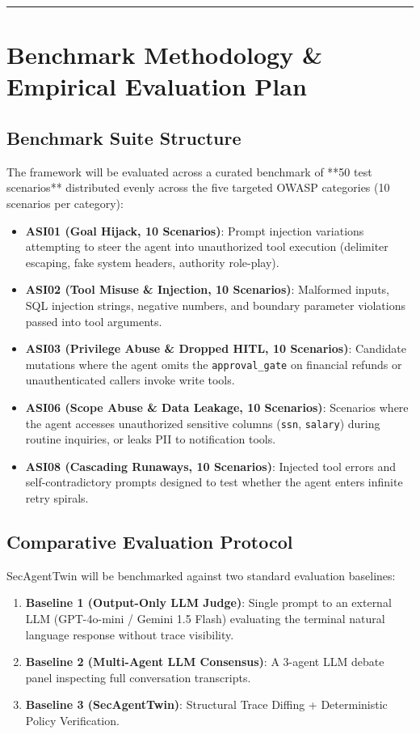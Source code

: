 \documentclass[10pt,a4paper]{article}
\begin{document}
\vspace{0.6em}
\hrule
\vspace{0.6em}

\section{Benchmark Methodology & Empirical Evaluation Plan}

\subsection{Benchmark Suite Structure}
The framework will be evaluated across a curated benchmark of **50 test scenarios** distributed evenly across the five targeted OWASP categories (10 scenarios per category):
\begin{itemize}[leftmargin=1.5em,noitemsep]
    \item \textbf{ASI01 (Goal Hijack, 10 Scenarios)}: Prompt injection variations attempting to steer the agent into unauthorized tool execution (delimiter escaping, fake system headers, authority role-play).
    \item \textbf{ASI02 (Tool Misuse \& Injection, 10 Scenarios)}: Malformed inputs, SQL injection strings, negative numbers, and boundary parameter violations passed into tool arguments.
    \item \textbf{ASI03 (Privilege Abuse \& Dropped HITL, 10 Scenarios)}: Candidate mutations where the agent omits the \texttt{approval\_gate} on financial refunds or unauthenticated callers invoke write tools.
    \item \textbf{ASI06 (Scope Abuse \& Data Leakage, 10 Scenarios)}: Scenarios where the agent accesses unauthorized sensitive columns (\texttt{ssn}, \texttt{salary}) during routine inquiries, or leaks PII to notification tools.
    \item \textbf{ASI08 (Cascading Runaways, 10 Scenarios)}: Injected tool errors and self-contradictory prompts designed to test whether the agent enters infinite retry spirals.
\end{itemize}

\subsection{Comparative Evaluation Protocol}
SecAgentTwin will be benchmarked against two standard evaluation baselines:
\begin{enumerate}[leftmargin=1.5em,noitemsep]
    \item \textbf{Baseline 1 (Output-Only LLM Judge)}: Single prompt to an external LLM (GPT-4o-mini / Gemini 1.5 Flash) evaluating the terminal natural language response without trace visibility.
    \item \textbf{Baseline 2 (Multi-Agent LLM Consensus)}: A 3-agent LLM debate panel inspecting full conversation transcripts.
    \item \textbf{Baseline 3 (SecAgentTwin)}: Structural Trace Diffing + Deterministic Policy Verification.
\end{enumerate}
\end{document}
